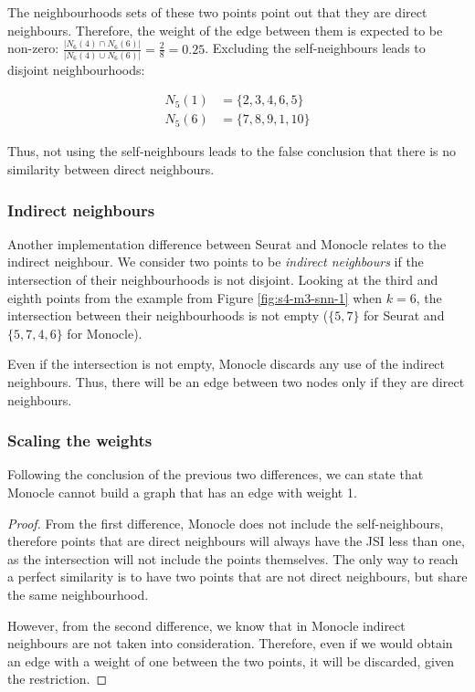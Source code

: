 The neighbourhoods sets of these two points point out that they are direct neighbours. Therefore, the weight of the edge between them is expected to be non-zero: $\displaystyle \frac{|N_6(4)  \cap N_6(6)|}{|N_6(4)  \cup N_6(6)|} = \frac{2}{8} = 0.25$. Excluding the self-neighbours leads to disjoint neighbourhoods:

\[ \begin{aligned}
    N_5(1) &= \{2,3,4,6,5\} \\
    N_5(6) &= \{7,8,9,1,10\}
    \end{aligned}
\]

Thus, not using the self-neighbours leads to the false conclusion that there is no similarity between direct neighbours.

\subsubsection{Indirect neighbours}
Another implementation difference between Seurat and Monocle relates to the indirect neighbour. We consider two points to be \textit{indirect neighbours} if the intersection of their neighbourhoods is not disjoint. Looking at the third and eighth points from the example from Figure \ref{fig:s4-m3-snn-1} when $k = 6$, the intersection between their neighbourhoods is not empty ($\{5, 7\}$ for Seurat and $\{5,7,4,6\}$ for Monocle).

Even if the intersection is not empty, Monocle discards any use of the indirect neighbours. Thus, there will be an edge between two nodes only if they are direct neighbours.

\subsubsection{Scaling the weights}
Following the conclusion of the previous two differences, we can state that Monocle cannot build a graph that has an edge with weight 1.

\begin{proof} From the first difference, Monocle does not include the self-neighbours, therefore points that are direct neighbours will always have the JSI less than one, as the intersection will not include the points themselves. The only way to reach a perfect similarity is to have two points that are not direct neighbours, but share the same neighbourhood.

However, from the second difference, we know that in Monocle indirect neighbours are not taken into consideration. Therefore, even if we would obtain an edge with a weight of one between the two points, it will be discarded, given the restriction.
\end{proof}

